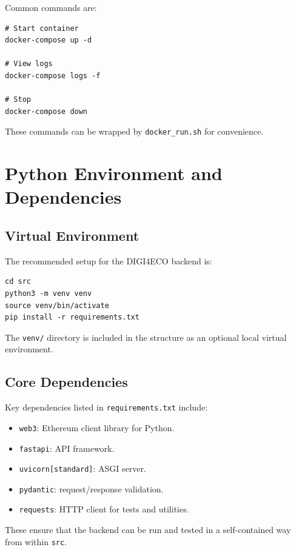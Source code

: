 \documentclass[11pt,a4paper]{article}
\begin{document}
Common commands are:

\begin{lstlisting}
# Start container
docker-compose up -d

# View logs
docker-compose logs -f

# Stop
docker-compose down
\end{lstlisting}

These commands can be wrapped by \texttt{docker\_run.sh} for convenience.

\section{Python Environment and Dependencies}
\label{sec:python-env}

\subsection{Virtual Environment}

The recommended setup for the DIGI4ECO backend is:

\begin{lstlisting}
cd src
python3 -m venv venv
source venv/bin/activate
pip install -r requirements.txt
\end{lstlisting}

The \texttt{venv/} directory is included in the structure as an optional local virtual environment.

\subsection{Core Dependencies}

Key dependencies listed in \texttt{requirements.txt} include:

\begin{itemize}[noitemsep]
  \item \texttt{web3}: Ethereum client library for Python.
  \item \texttt{fastapi}: API framework.
  \item \texttt{uvicorn[standard]}: ASGI server.
  \item \texttt{pydantic}: request/response validation.
  \item \texttt{requests}: HTTP client for tests and utilities.
\end{itemize}

These ensure that the backend can be run and tested in a self-contained way from within \texttt{src}.
\end{document}
